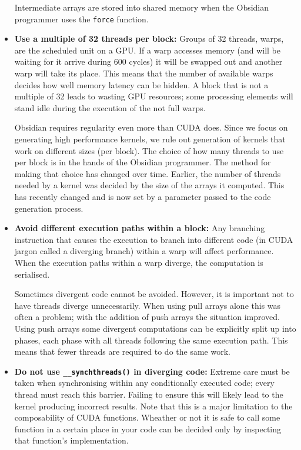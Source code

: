 \documentclass[a4paper]{book}
\begin{document}
\begin{itemize}
Intermediate arrays are stored into shared memory when the Obsidian programmer uses 
the {\tt force} function. 

\item {\bf Use a multiple of 32 threads per block:} Groups of 32 threads, warps, are the 
scheduled unit on a GPU. If a warp accesses memory (and will be waiting for it arrive during 
600 cycles) it will be swapped out and another warp will take its place. This means that 
the number of available warps decides how well memory latency can be hidden. A block that is 
not a multiple of 32 leads to wasting GPU resources; some processing elements will stand 
idle during the execution of the not full warps. 

Obsidian requires regularity even more than CUDA does. Since we focus on generating high 
performance kernels, we rule out generation of kernels that work on different sizes (per block). 
The choice of how many threads to use per block is in the hands of the Obsidian programmer.
The method for making that choice has changed over time. Earlier, the number of threads 
needed by a kernel was decided by the size of the arrays it computed. This has recently changed
and is now set by a parameter passed to the code generation process.  

\item {\bf Avoid different execution paths within a block:} Any branching instruction that 
causes the execution to branch into different code (in CUDA jargon called a diverging branch) 
within a warp will affect performance. When the execution paths within a warp diverge, the 
computation is serialised. 

Sometimes divergent code cannot be avoided. However, it is important not to have threads 
diverge unnecessarily. When using pull arrays alone this was often a problem; with the 
addition of push arrays the situation improved. Using push arrays some divergent computations 
can be explicitly split up into phases, each phase with all threads following the 
same execution path. This means that fewer threads are required to do the same work. 

\item {\bf Do not use {\tt \_\_synchthreads()} in diverging code:} Extreme care must be taken 
when synchronising within any conditionally executed code; every thread must reach this barrier.
Failing to ensure this will likely lead to the kernel producing incorrect results. Note that 
this is a major limitation to the composability of CUDA functions. Wheather or not it is safe to 
call some function in a certain place in your code can be decided only by inspecting that 
function's implementation. 


\end{itemize}
\end{document}
